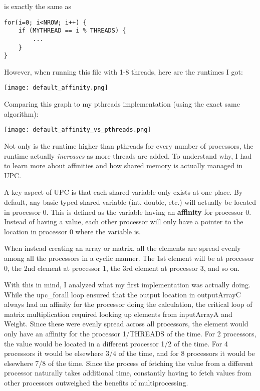 \documentclass{article}
\begin{document}
\noindent
is exactly the same as

\begin{lstlisting}
for(i=0; i<NROW; i++) {
    if (MYTHREAD == i % THREADS) {
        ...
    }
}
\end{lstlisting}

\noindent
However, when running this file with 1-8 threads, here are the runtimes I got:

\begin{center}
    \texttt{[image: default\_affinity.png]}
\end{center}

Comparing this graph to my pthreads implementation (using the exact same algorithm):

\begin{center}
    \texttt{[image: default\_affinity\_vs\_pthreads.png]}
\end{center}

\noindent
Not only is the runtime higher than pthreads for every number of processors, the runtime actually \emph{increases} as more threads are added. To understand why, I had to learn more about affinities and how shared memory is actually managed in UPC.

A key aspect of UPC is that each shared variable only exists at one place. By default, any basic typed shared variable (int, double, etc.) will actually be located in processor 0. This is defined as the variable having an \textbf{affinity} for processor 0. Instead of having a value, each other processor will only have a pointer to the location in processor 0 where the variable is.

When instead creating an array or matrix, all the elements are spread evenly among all the processors in a cyclic manner. The 1st element will be at processor 0, the 2nd element at processor 1, the 3rd element at processor 3, and so on. 

With this in mind, I analyzed what my first implementation was actually doing. While the upc\_forall loop ensured that the output location in outputArrayC always had an affinity for the processor doing the calculation, the critical loop of matrix multiplication required looking up elements from inputArrayA and Weight. Since these were evenly spread across all processors, the element would only have an affinity for the processor 1/THREADS of the time. For 2 processors, the value would be located in a different processor 1/2 of the time. For 4 processors it would be elsewhere 3/4 of the time, and for 8 processors it would be elsewhere 7/8 of the time. Since the process of fetching the value from a different processor naturally takes additional time, constantly having to fetch values from other processors outweighed the benefits of multiprocessing.
\end{document}
